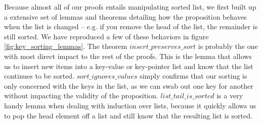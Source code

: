 Because almost all of our proofs entails manipulating sorted list, we first built up a extensive set of lemmas and theorems detailing how the proposition behaves when the list is changed -- e.g. if you remove the head of the list, the remainder is still sorted. We have reproduced a few of these behaviors in figure \ref{fig:key_sorting_lemmas}. The theorem $insert\_preserves\_sort$ is probably the one with most direct impact to the rest of the proofs. This is the lemma that allows us to insert new items into a key-value or key-pointer list and know that the list continues to be sorted. $sort\_ignores\_values$ simply confirms that our sorting is only concerned with the keys in the list, as we can swab out one key for another without impacting the validity of the proposition. $list\_tail\_is\_sorted$ is a very handy lemma when dealing with induction over lists, because it quickly allows us to pop the head element off a list and still know that the resulting list is sorted.

